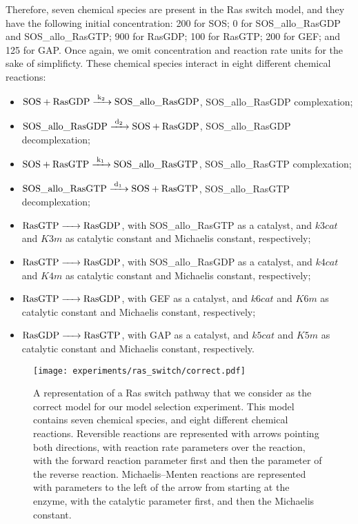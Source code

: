 Therefore, seven chemical species are present in the Ras switch model, and they have the following initial
concentration: 200 for SOS; 0 for SOS\_allo\_RasGDP and
SOS\_allo\_RasGTP; 900 for RasGDP; 100 for RasGTP; 200 for GEF; and 125
for GAP. Once again, we omit concentration and reaction rate units for
the sake of simplificty. These chemical species interact in eight
different chemical reactions:
\begin{itemize}
    \item{$\ce{SOS + RasGDP ->[k2] SOS\_allo\_RasGDP}$}, SOS\_allo\_RasGDP complexation;
    \item{$\ce{SOS\_allo\_RasGDP ->[d2] SOS + RasGDP}$}, SOS\_allo\_RasGDP decomplexation;
    \item{$\ce{SOS + RasGTP ->[k1] SOS\_allo\_RasGTP}$}, SOS\_allo\_RasGTP complexation;
    \item{$\ce{SOS\_allo\_RasGTP ->[d1] SOS + RasGTP}$}, SOS\_allo\_RasGTP decomplexation;
    \item{$\ce{RasGTP -> RasGDP}$}, with SOS\_allo\_RasGTP as a
        catalyst, and $k3cat$ and $K3m$ as catalytic constant and
        Michaelis constant, respectively;
    \item{$\ce{RasGTP -> RasGDP}$}, with SOS\_allo\_RasGDP as a 
        catalyst, and $k4cat$ and $K4m$ as catalytic constant and
        Michaelis constant, respectively;
    \item{$\ce{RasGTP -> RasGDP}$}, with GEF as a catalyst, and
        $k6cat$ and $K6m$ as catalytic constant and Michaelis constant,
        respectively;
    \item{$\ce{RasGDP -> RasGTP}$}, with GAP as a catalyst, and
        $k5cat$ and $K5m$ as catalytic constant and Michaelis constant,
        respectively.
\end{itemize}

\begin{figure}[H]
\begin{center}
\texttt{[image: experiments/ras\_switch/correct.pdf]}
\caption{A representation of a Ras switch pathway that we consider as
    the correct model for our model selection experiment. This model
    contains seven chemical species, and eight different chemical
    reactions. Reversible reactions are represented with arrows pointing
    both directions, with reaction rate parameters over the reaction,
    with the forward reaction parameter first and then the parameter of
    the reverse reaction. Michaelis--Menten reactions are represented
    with parameters to the left of the arrow from starting at the
    enzyme, with the catalytic parameter first, and then the Michaelis
    constant.
}
\label{fig:ras_switch:correct_model}
\end{center}
\end{figure}

